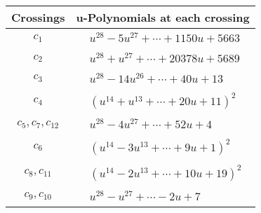 \documentclass[1p]{elsarticle_modified}
\theoremstyle{definition}
\begin{document}
\begin{tabular}{m{50pt}|m{274pt}}
Crossings & \hspace{64pt}u-Polynomials at each crossing \\
\hline $$\begin{aligned}c_{1}\end{aligned}$$&$\begin{aligned}
&u^{28}-5 u^{27}+\cdots+1150 u+5663
\end{aligned}$\\
\hline $$\begin{aligned}c_{2}\end{aligned}$$&$\begin{aligned}
&u^{28}+u^{27}+\cdots+20378 u+5689
\end{aligned}$\\
\hline $$\begin{aligned}c_{3}\end{aligned}$$&$\begin{aligned}
&u^{28}-14 u^{26}+\cdots+40 u+13
\end{aligned}$\\
\hline $$\begin{aligned}c_{4}\end{aligned}$$&$\begin{aligned}
&(u^{14}+u^{13}+\cdots+20 u+11)^{2}
\end{aligned}$\\
\hline $$\begin{aligned}c_{5},c_{7},c_{12}\end{aligned}$$&$\begin{aligned}
&u^{28}-4 u^{27}+\cdots+52 u+4
\end{aligned}$\\
\hline $$\begin{aligned}c_{6}\end{aligned}$$&$\begin{aligned}
&(u^{14}-3 u^{13}+\cdots+9 u+1)^{2}
\end{aligned}$\\
\hline $$\begin{aligned}c_{8},c_{11}\end{aligned}$$&$\begin{aligned}
&(u^{14}-2 u^{13}+\cdots+10 u+19)^{2}
\end{aligned}$\\
\hline $$\begin{aligned}c_{9},c_{10}\end{aligned}$$&$\begin{aligned}
&u^{28}- u^{27}+\cdots-2 u+7
\end{aligned}$\\
\hline
\end{tabular}\\~\\
\end{document}
